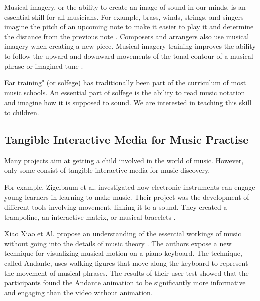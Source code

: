 Musical imagery, or the ability to create an image of sound in our minds, is an essential
skill for all musicians. For example, brass, winds, strings, and singers imagine the
pitch of an upcoming note to make it easier to play it and determine the distance from
the previous note
\cite{zatorre2005mental}. Composers and arrangers also use musical imagery when creating a new piece. Musical imagery training improves the ability to follow the upward and downward movements of the tonal contour of a musical phrase or imagined tune \cite{weber1986musical}.

Ear training" (or solfege) has traditionally been part of the curriculum of most music
schools. An essential part of solfege is the ability to read music notation and imagine
how it is supposed to sound. We are interested in teaching this skill to children.

\subsection{Tangible Interactive Media for Music Practise}

Many projects aim at getting a child involved in the world of music. However, only some consist of tangible interactive media for music discovery.

For example, Zigelbaum et al. investigated how electronic instruments can engage young learners in learning to make music. Their project was the development of different tools involving movement, linking it to a sound. They created a trampoline, an interactive matrix, or musical bracelets \cite{zigelbaum2006bodybeats}.

Xiao Xiao et Al. propose an understanding of the essential workings of music without going into the details of music theory \cite{xiao2014andante}.
The authors expose a new technique for visualizing musical motion on a piano keyboard. The technique, called Andante, uses walking figures that move along the keyboard to represent the movement of musical phrases. The results of their user test showed that the participants found the Andante animation to be significantly more informative and engaging than the video without animation.

